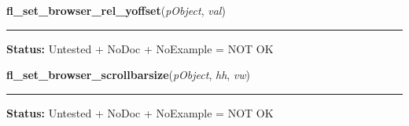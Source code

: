     \vspace{0.5ex}

\hspace{.8\funcindent}\begin{boxedminipage}{\funcwidth}

    \raggedright \textbf{fl\_set\_browser\_rel\_yoffset}(\textit{pObject}, \textit{val})

    \vspace{-1.5ex}

    \rule{\textwidth}{0.5\fboxrule}
\setlength{\parskip}{2ex}
\setlength{\parskip}{1ex}
\textbf{Status:} Untested + NoDoc + NoExample = NOT OK



    \end{boxedminipage}

    \label{xformslib:library:fl_set_browser_scrollbarsize}

    \vspace{0.5ex}

\hspace{.8\funcindent}\begin{boxedminipage}{\funcwidth}

    \raggedright \textbf{fl\_set\_browser\_scrollbarsize}(\textit{pObject}, \textit{hh}, \textit{vw})

    \vspace{-1.5ex}

    \rule{\textwidth}{0.5\fboxrule}
\setlength{\parskip}{2ex}
\setlength{\parskip}{1ex}
\textbf{Status:} Untested + NoDoc + NoExample = NOT OK



    \end{boxedminipage}

    \label{xformslib:library:fl_show_browser_line}

    \vspace{0.5ex}

